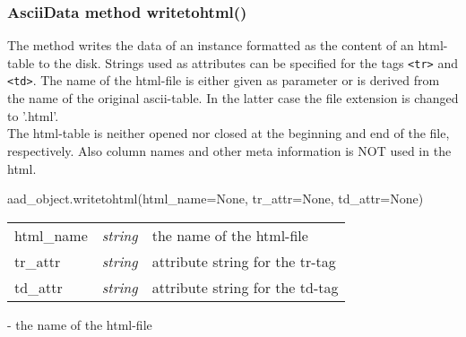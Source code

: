 \subsubsection{AsciiData method writetohtml()}
\label{adm_writetohtml}
%
The method writes the data of an \ad instance formatted as the content of
an html-table to the disk. Strings used as attributes can be specified
for the tags {\tt<tr>} and {\tt <td>}. The name of the html-file is either
given as parameter or is derived from the name of the original ascii-table.
In the latter case the file extension is changed to '.html'.\\
The html-table is neither opened nor closed at
the beginning and end of the file, respectively. Also column names and
other meta information is NOT used in the html.

aad\_object.writetohtml(html\_name=None, tr\_attr=None, td\_attr=None)

\begin{tabular}{lcl}
html\_name & {\it string} & the name of the html-file\\
tr\_attr & {\it string} & attribute string for the tr-tag\\
td\_attr & {\it string} & attribute string for the td-tag\\
\end{tabular}

- the name of the html-file

